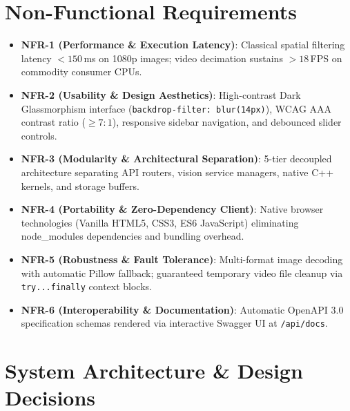 \documentclass[12pt,a4paper]{article}
\begin{document}
\section{Non-Functional Requirements}
\begin{itemize}
    \item \textbf{NFR-1 (Performance \& Execution Latency)}: Classical spatial filtering latency $< 150$\,ms on 1080p images; video decimation sustains $> 18$\,FPS on commodity consumer CPUs.
    \item \textbf{NFR-2 (Usability \& Design Aesthetics)}: High-contrast Dark Glassmorphism interface (\texttt{backdrop-filter: blur(14px)}), WCAG AAA contrast ratio ($\ge 7:1$), responsive sidebar navigation, and debounced slider controls.
    \item \textbf{NFR-3 (Modularity \& Architectural Separation)}: 5-tier decoupled architecture separating API routers, vision service managers, native C++ kernels, and storage buffers.
    \item \textbf{NFR-4 (Portability \& Zero-Dependency Client)}: Native browser technologies (Vanilla HTML5, CSS3, ES6 JavaScript) eliminating node\_modules dependencies and bundling overhead.
    \item \textbf{NFR-5 (Robustness \& Fault Tolerance)}: Multi-format image decoding with automatic Pillow fallback; guaranteed temporary video file cleanup via \texttt{try...finally} context blocks.
    \item \textbf{NFR-6 (Interoperability \& Documentation)}: Automatic OpenAPI 3.0 specification schemas rendered via interactive Swagger UI at \texttt{/api/docs}.
\end{itemize}

\section{System Architecture \& Design Decisions}
\end{document}
